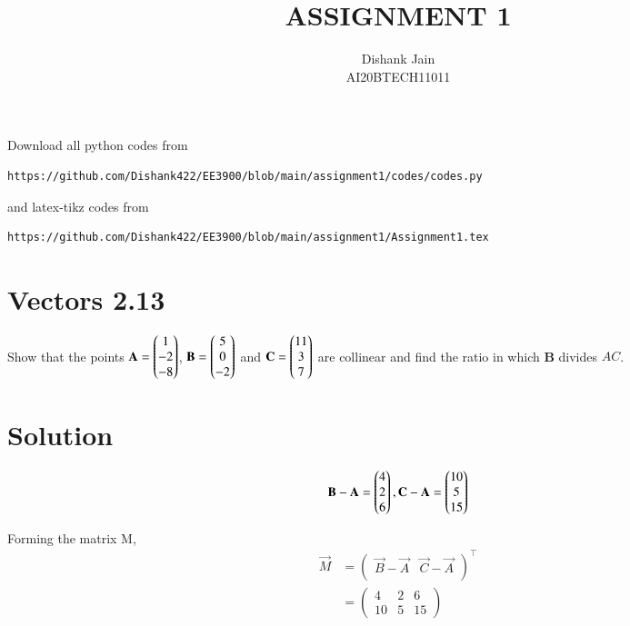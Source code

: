 \documentclass[journal,12pt,twocolumn]{IEEEtran}
\begin{document}
     \def\centbox#1{\makebox[0in]{#1}}
     \def\topbox#1{\raisebox{-\baselineskip}[0in][0in]{#1}}
     \def\midbox#1{\raisebox{-0.5\baselineskip}[0in][0in]{#1}}
\vspace{3cm}
\title{ASSIGNMENT 1}
\author{Dishank Jain \\ AI20BTECH11011}
\maketitle
\newpage
\bigskip
\renewcommand{\thefigure}{\theenumi}
\renewcommand{\thetable}{\theenumi}
Download all python codes from 
\begin{lstlisting}
https://github.com/Dishank422/EE3900/blob/main/assignment1/codes/codes.py
\end{lstlisting}
%
and latex-tikz codes from 
%
\begin{lstlisting}
https://github.com/Dishank422/EE3900/blob/main/assignment1/Assignment1.tex
\end{lstlisting}
%
\section{Vectors 2.13}
Show that the points $\mathbf{A} = \begin{pmatrix}1\\-2\\-8\end{pmatrix}$, $\mathbf{B}=\begin{pmatrix}5\\0\\-2\end{pmatrix}$ and $\mathbf{C}=\begin{pmatrix}11\\3\\7\end{pmatrix}$ are collinear and find the ratio in which \textbf{B} divides $AC$.

\section{Solution}
\begin{equation}
    \mathbf{B} - \mathbf{A} = \begin{pmatrix}4\\2\\6\end{pmatrix}, \mathbf{C} - \mathbf{A} = \begin{pmatrix}10\\5\\15\end{pmatrix}
\end{equation}

Forming the matrix M,
\begin{align}
    \vec{M} &= \begin{pmatrix}
    \vec{B} - \vec{A} & \vec{C} - \vec{A}\\
    \end{pmatrix}^\top\\
    &= \begin{pmatrix}
    4 & 2 & 6\\
    10 & 5 & 15
    \end{pmatrix}
\end{align}
\end{document}
